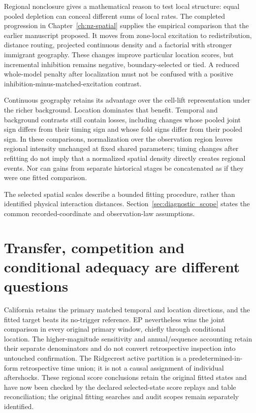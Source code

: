 Regional nonclosure gives a mathematical reason to test local structure: equal pooled depletion can conceal different sums of local rates. The completed progression in Chapter~\ref{ch:nz-spatial} supplies the empirical comparison that the earlier manuscript proposed. It moves from zone-local excitation to redistribution, distance routing, projected continuous density and a factorial with stronger immigrant geography. These changes improve particular location scores, but incremental inhibition remains negative, boundary-selected or tied. A reduced whole-model penalty after localization must not be confused with a positive inhibition-minus-matched-excitation contrast.

Continuous geography retains its advantage over the cell-lift representation under the richer background. Location dominates that benefit. Temporal and background contrasts still contain losses, including changes whose pooled joint sign differs from their timing sign and whose fold signs differ from their pooled sign. In these comparisons, normalization over the observation region leaves regional intensity unchanged at fixed shared parameters; timing changes after refitting do not imply that a normalized spatial density directly creates regional events. Nor can gains from separate historical stages be concatenated as if they were one fitted comparison.

The selected spatial scales describe a bounded fitting procedure, rather than
identified physical interaction distances. Section~\ref{sec:diagnostic_scope}
states the common recorded-coordinate and observation-law assumptions.

\section{Transfer, competition and conditional adequacy are different questions}

California retains the primary matched temporal and location directions, and the fitted target beats its no-trigger reference. EP nevertheless wins the joint comparison in every original primary window, chiefly through conditional location. The higher-magnitude sensitivity and annual/sequence accounting retain their separate denominators and do not convert retrospective inspection into untouched confirmation. The Ridgecrest active partition is a predetermined-in-form retrospective time union; it is not a causal assignment of individual aftershocks. These regional score conclusions retain the original fitted states and have now been checked by the declared selected-state score replays and table reconciliation; the original fitting searches and audit scopes remain separately identified.

